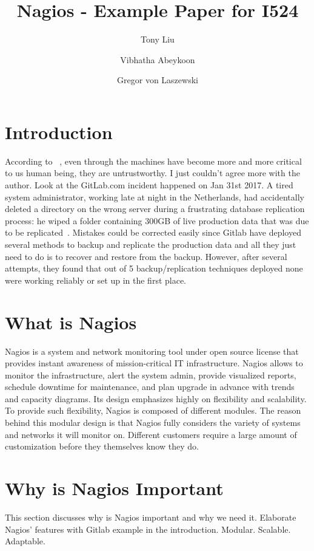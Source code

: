 \documentclass[9pt,twocolumn,twoside]{styles/osajnl}
\title{Nagios - Example Paper for I524}
\author[1]{Tony Liu}
\author[1]{Vibhatha Abeykoon}
\author[1]{Gregor von Laszewski}
\affil[1]{School of Informatics and Computing, Bloomington, IN 47408, U.S.A.}
\begin{document}
\maketitle

\section{Introduction}

According to ~\cite{nagios-book}, even through the machines have become more and 
more critical to us human being, they are untrustworthy. I just couldn't agree more with the author. Look at the GitLab.com incident happened on Jan 31st 2017. A tired system administrator, working late at night in the Netherlands, had accidentally deleted a directory on the wrong server during a frustrating database replication process: he wiped a folder containing 300GB of live production data that was due to be replicated~\cite{gitlabmeltdown}. Mistakes could be corrected easily since Gitlab have deployed several methods to backup and replicate the production data and all they just need to  do is to recover and restore from the backup. However, after several attempts, they found that out of 5 backup/replication techniques deployed none were working reliably or set up in the first place.


\section{What is Nagios}

Nagios is a system and network monitoring tool under open source license that provides instant awareness of mission-critical IT infrastructure. Nagios allows to monitor the infrastructure, alert the system admin, provide visualized reports, schedule downtime for maintenance, and plan upgrade in advance with trends and capacity diagrams. Its design emphasizes highly on flexibility and scalability. To provide such flexibility, Nagios is composed of different modules. The reason behind this modular design is that Nagios fully considers the variety of systems and networks it will monitor on. Different customers require a large amount of customization before they themselves know they do.



\section{Why is Nagios Important}

This section discusses why is Nagios important and why we need it.
Elaborate Nagios' features with Gitlab example in the introduction.
Modular. Scalable. Adaptable.
\end{document}
